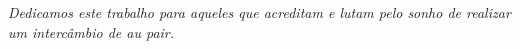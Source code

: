 \begin{dedicatoria}
   \vspace*{\fill}
   \centering
   \noindent
   \textit{Dedicamos este trabalho para aqueles que acreditam e lutam pelo sonho de realizar um intercâmbio de au pair.}
   \vspace*{\fill}
\end{dedicatoria}

